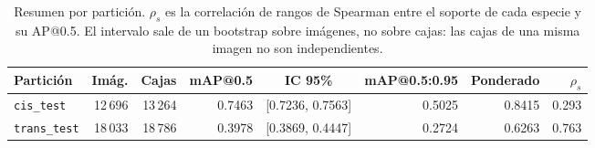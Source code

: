 \begin{table}[t]
  \centering
  \small
  \begin{tabular}{lrrrcrrr}
    \toprule
    Partición & Imág. & Cajas & mAP@0.5 & IC 95\% & mAP@0.5:0.95 & Ponderado & $\rho_s$ \\
    \midrule
    \texttt{cis\_test} & 12\,696 & 13\,264 & 0.7463 & [0.7236, 0.7563] & 0.5025 & 0.8415 & 0.293 \\
    \texttt{trans\_test} & 18\,033 & 18\,786 & 0.3978 & [0.3869, 0.4447] & 0.2724 & 0.6263 & 0.763 \\
    \bottomrule
  \end{tabular}
  \caption{Resumen por partición. $\rho_s$ es la correlación de rangos de Spearman entre el soporte de cada especie y su AP@0.5. El intervalo sale de un bootstrap sobre imágenes, no sobre cajas: las cajas de una misma imagen no son independientes.}
  \label{tab:resumen}
\end{table}
